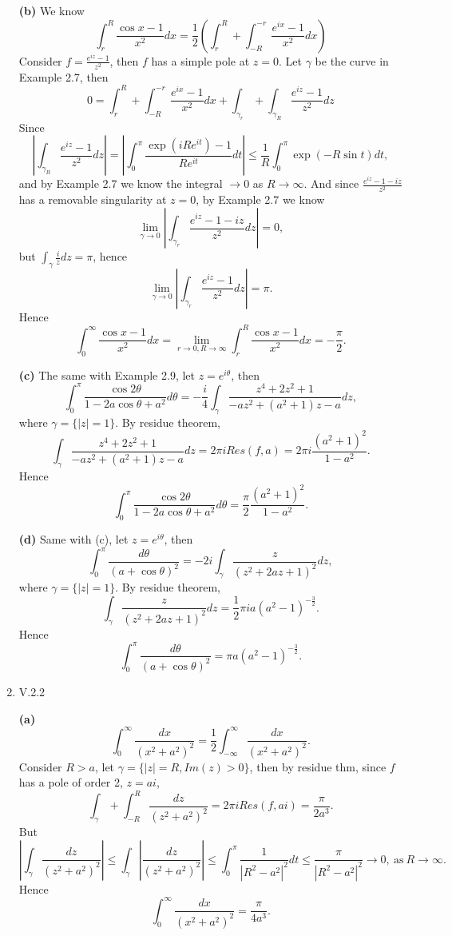 \documentclass{article}%
\begin{document}
\begin{enumerate}
\textbf{(b)} We know 
$$
\int_{r}^{R}\frac{\cos x-1}{x^2}dx = \frac{1}{2}\left(\int_{r}^{R}+\int_{-R}^{-r}\frac{e^{ix}-1}{x^2}dx\right)
$$
Consider $f = \frac{e^{iz}-1}{z^2}$, then $f$ has a simple pole at $z = 0$. Let $\gamma$ be the curve in Example 2.7, then
$$
0 = \int_{r}^{R}+\int_{-R}^{-r}\frac{e^{ix}-1}{x^2}dx + \int_{\gamma_r}+\int_{\gamma_R}\frac{e^{iz}-1}{z^2}dz
$$
Since 
$$
\left|\int_{\gamma_R}\frac{e^{iz}-1}{z^2}dz\right| = \left|\int_{0}^{\pi}\frac{\exp(iRe^{it})-1}{Re^{it}}dt\right| \le \frac{1}{R}\int_{0}^{\pi}\exp(-R\sin t)dt,
$$
and by Example 2.7 we know the integral $\to 0$ as $R\to \infty$. And since $\frac{e^{iz}-1-iz}{z^2}$ has a removable singularity at $z = 0$, by Example 2.7 we know
$$
\lim_{\gamma\to 0}\left|\int_{\gamma_r}\frac{e^{iz}-1-iz}{z^2}dz\right| = 0, 
$$
but $\int_{\gamma}\frac{i}{z}dz = \pi$, hence 
$$
\lim_{\gamma\to 0}\left|\int_{\gamma_r}\frac{e^{iz}-1}{z^2}dz\right| = \pi.
$$
Hence
$$
\int_{0}^{\infty}\frac{\cos x-1}{x^2}dx = \lim_{r\to 0, R\to\infty}\int_{r}^{R}\frac{\cos x-1}{x^2}dx = -\frac{\pi}{2}.
$$

\textbf{(c)} The same with Example 2.9, let $z = e^{i\theta} $, then
$$
\int_{0}^{\pi}\frac{\cos 2\theta}{1-2a\cos\theta +a^2}d\theta = -\frac{i}{4}\int_{\gamma}\frac{z^4+2z^2+1}{-az^2+(a^2+1)z-a}dz,
$$
where $\gamma = \{|z| = 1\}$. By residue theorem, 
$$
\int_{\gamma}\frac{z^4+2z^2+1}{-az^2+(a^2+1)z-a}dz = 2\pi iRes(f, a) = 2\pi i\frac{(a^2+1)^2}{1-a^2}.
$$
Hence
$$
\int_{0}^{\pi}\frac{\cos 2\theta}{1-2a\cos\theta +a^2}d\theta = \frac{\pi}{2}\frac{(a^2+1)^2}{1-a^2}.
$$

\textbf{(d)} Same with (c), let $z = e^{i\theta} $, then
$$
\int_{0}^{\pi}\frac{d\theta}{(a+\cos\theta)^2} = -2i\int_{\gamma}\frac{z}{(z^2+2az+1)^2}dz,
$$
where $\gamma = \{|z| = 1\}$. By residue theorem, 
$$
\int_{\gamma}\frac{z}{(z^2+2az+1)^2}dz = \frac{1}{2}\pi i a(a^2-1)^{-\frac{3}{2}}.
$$
Hence
$$
\int_{0}^{\pi}\frac{d\theta}{(a+\cos\theta)^2} = \pi a(a^2-1)^{-\frac{3}{2}}.
$$


\item V.2.2

\textbf{(a)}
$$
\int_{0}^{\infty}\frac{dx}{(x^2+a^2)^2} = \frac{1}{2}\int_{-\infty}^{\infty}\frac{dx}{(x^2+a^2)^2}.
$$
Consider $R > a$, let $\gamma = \{|z| = R, Im(z) > 0 \}$, then by residue thm, since $f$ has a pole of order 2, $z = ai$,
$$
\int_{\gamma} +\int_{-R}^{R} \frac{dz}{(z^2+a^2)^2} = 2\pi i Res(f, ai) = \frac{\pi}{2a^3}.
$$
But
$$
\left|\int_{\gamma}\frac{dz}{(z^2+a^2)^2}\right| \le \int_{\gamma}\left|\frac{dz}{(z^2+a^2)^2}\right| \le \int_{0}^{\pi}\frac{1}{|R^2-a^2|^2}dt \le \frac{\pi}{|R^2-a^2|^2} \to 0, ~\text{as}~ R\to\infty.
$$
Hence
$$
\int_{0}^{\infty}\frac{dx}{(x^2+a^2)^2} = \frac{\pi}{4a^3}.
$$


\end{enumerate}
\end{document}
